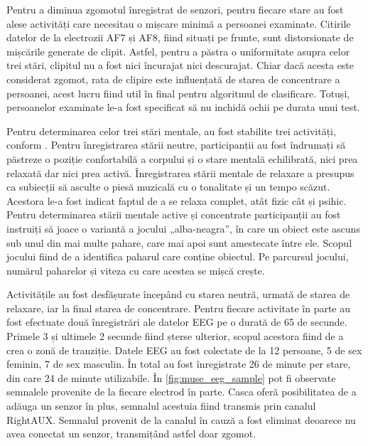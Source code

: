 Pentru a diminua zgomotul înregistrat de senzori, pentru fiecare stare au fost alese activități care necesitau o mișcare minimă a persoanei examinate. Citirile datelor de la electrozii AF7 și AF8, fiind situați pe frunte, sunt distorsionate de mișcările generate de clipit. Astfel, pentru a păstra o uniformitate asupra celor trei stări, clipitul nu a fost nici încurajat nici descurajat. Chiar dacă acesta este considerat zgomot, rata de clipire este influențată de starea de concentrare a persoanei, acest lucru fiind util în final pentru algoritmul de clasificare. Totuși, persoanelor examinate le-a fost specificat să nu inchidă ochii pe durata unui test.

Pentru determinarea celor trei stări mentale, au fost stabilite trei activități, conform \cite{eeg:2018}. Pentru înregistrarea stării neutre, participanții au fost îndrumați să păstreze o poziție confortabilă a corpului și o stare mentală echilibrată, nici prea relaxată dar nici prea activă. Înregistrarea stării mentale de relaxare a presupus ca subiecții să asculte o piesă muzicală cu o tonalitate și un tempo scăzut. Acestora le-a fost indicat faptul de a se relaxa complet, atât fizic cât și psihic. Pentru determinarea stării mentale active și concentrate participanții au fost instruiți să joace o variantă a jocului „alba-neagra”, în care un obiect este ascuns sub unul din mai multe pahare, care mai apoi sunt amestecate între ele. Scopul jocului fiind de a identifica paharul care conține obiectul. Pe parcursul jocului, numărul paharelor și viteza cu care acestea se mișcă crește.

Activitățile au fost desfășurate începând cu starea neutră, urmată de starea de relaxare, iar la final starea de concentrare. Pentru fiecare activitate în parte au fost efectuate două înregistrări ale datelor EEG pe o durată de 65 de secunde. Primele 3 și ultimele 2 secunde fiind șterse ulterior, scopul acestora fiind de a crea o zonă de tranziție. Datele EEG au fost colectate de la 12 persoane, 5 de sex feminin, 7 de sex masculin. În total au fost înregistrate 26 de minute per stare, din care 24 de minute utilizabile. În \autoref{fig:muse_eeg_sample} pot fi observate semnalele provenite de la fiecare electrod în parte. Casca oferă posibilitatea de a adăuga un senzor în plus, semnalul acestuia fiind transmis prin canalul RightAUX. Semnalul provenit de la canalul în cauză a fost eliminat deoarece nu avea conectat un senzor, transmițând astfel doar zgomot.

